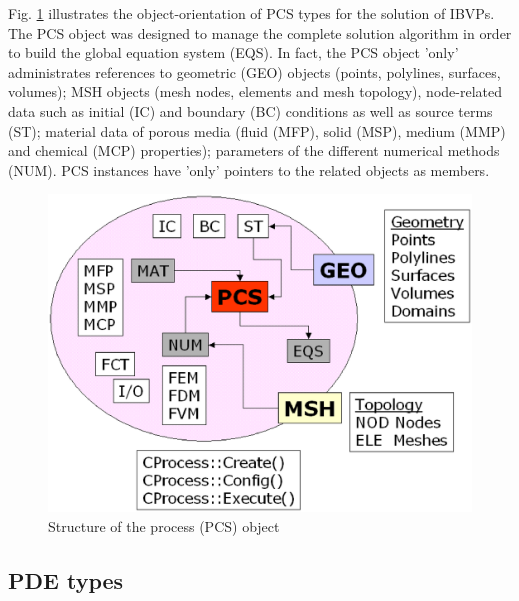Fig. \ref{fig:pcs} illustrates the object-orientation of PCS types 
for the solution of IBVPs. The PCS object was designed to manage the 
complete solution algorithm in order to build the global equation 
system (EQS). In fact, the PCS object 'only' administrates 
references to geometric (GEO) objects (points, polylines, surfaces, 
volumes); MSH objects (mesh nodes, elements and mesh topology), 
node-related data such as initial (IC) and boundary (BC) conditions 
as well as source terms (ST); material data of porous media (fluid 
(MFP), solid (MSP), medium (MMP) and chemical (MCP) properties); 
parameters of the different numerical methods (NUM). PCS instances 
have 'only' pointers to the related objects as members. 

\begin{figure}[htb!]
\centering
\includegraphics[scale=0.5]{figures/pcs.eps}
\caption{Structure of the process (PCS) object} \label{fig:pcs}
\end{figure}

\subsection{PDE types}
\label{sec:pde}

